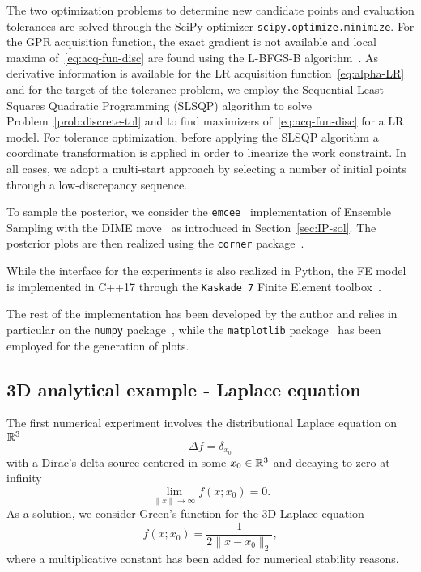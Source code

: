 The two optimization problems to determine new candidate points and evaluation tolerances are solved through the SciPy optimizer \texttt{scipy.optimize.minimize}. 
For the GPR acquisition function, the exact gradient is not available and local maxima of~\eqref{eq:acq-fun-disc} are found using the L-BFGS-B algorithm~\cite{ZhuBirdNocedal}. 
As derivative information is available for the LR acquisition function~\eqref{eq:alpha-LR} and for the target of the tolerance problem, we employ the Sequential Least Squares Quadratic Programming (SLSQP) algorithm to solve Problem~\eqref{prob:discrete-tol} and to find maximizers of~\eqref{eq:acq-fun-disc} for a LR model. 
For tolerance optimization, before applying the SLSQP algorithm a coordinate transformation is applied in order to linearize the work constraint. 
In all cases, we adopt a multi-start approach by selecting a number of initial points through a low-discrepancy sequence. \medskip

To sample the posterior, we consider the \texttt{emcee}~\cite{emceePaper} implementation of Ensemble Sampling with the DIME move~\cite{Boehl} as introduced in Section~\ref{sec:IP-sol}. 
The posterior plots are then realized using the \texttt{corner} package~\cite{corner}. \medskip

While the interface for the experiments is also realized in Python, the FE model is implemented in C++17 through the \texttt{Kaskade 7} Finite Element toolbox~\cite{GoetschelSchielaWeiser2021}.\medskip

The rest of the implementation has been developed by the author and relies in particular on the \texttt{numpy} package~\cite{numpy}, while the \texttt{matplotlib} package~\cite{matplotlib} has been employed for the generation of plots. 



\subsection{3D analytical example - Laplace equation}\label{sec:3dexp}

The first numerical experiment involves the distributional Laplace equation on $\mathbb{R}^3$
\[
 \Delta f = \delta_{x_0}
\] 
with a Dirac's delta source centered in some $x_0 \in \mathbb{R}^3$ and decaying to zero at infinity
\[
\lim_{\| x \| \to \infty} f(x; x_0) = 0.
\]
As a solution, we consider Green's function for the 3D Laplace equation
\[
f(x; x_0) =  \frac{1}{2 \|x-x_0\|_2},
\]
where a multiplicative constant has been added for numerical stability reasons. \medskip

